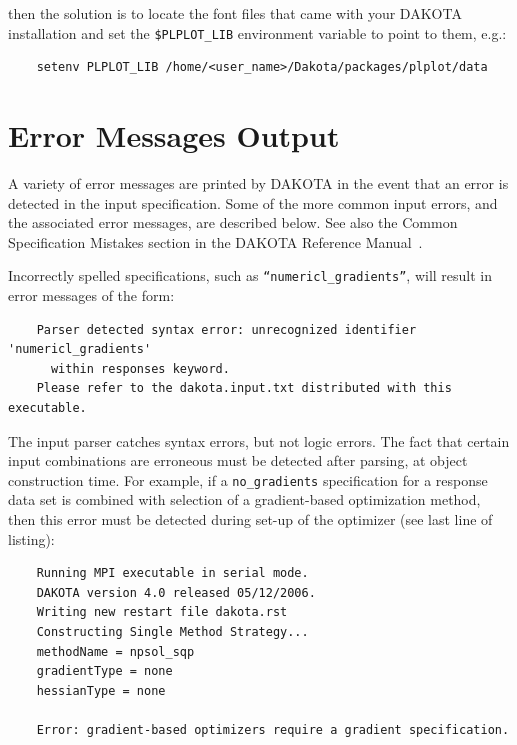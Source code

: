 then the solution is to locate the font files that came with your
DAKOTA installation and set the \texttt{\$PLPLOT\_LIB} environment
variable to point to them, e.g.:
\begin{small}
\begin{verbatim}
    setenv PLPLOT_LIB /home/<user_name>/Dakota/packages/plplot/data
\end{verbatim}
\end{small}

\section{Error Messages Output}\label{output:error}

A variety of error messages are printed by DAKOTA in the event that an
error is detected in the input specification. Some of the more common
input errors, and the associated error messages, are described below.
See also the Common Specification Mistakes section in the DAKOTA
Reference Manual~\cite{RefMan}.

Incorrectly spelled specifications, such as 
\texttt{``numericl\_gradients''}, will result in error messages of the form:
\begin{small}
\begin{verbatim}
    Parser detected syntax error: unrecognized identifier 'numericl_gradients'
      within responses keyword.
    Please refer to the dakota.input.txt distributed with this executable.
\end{verbatim}
\end{small}

The input parser catches syntax errors, but not logic errors. The fact
that certain input combinations are erroneous must be detected after
parsing, at object construction time. For example, if a
\texttt{no\_gradients} specification for a response data set is
combined with selection of a gradient-based optimization method, then
this error must be detected during set-up of the optimizer (see last
line of listing):
\begin{small}
\begin{verbatim}
    Running MPI executable in serial mode.
    DAKOTA version 4.0 released 05/12/2006.
    Writing new restart file dakota.rst
    Constructing Single Method Strategy...
    methodName = npsol_sqp
    gradientType = none
    hessianType = none

    Error: gradient-based optimizers require a gradient specification.
\end{verbatim}
\end{small}

